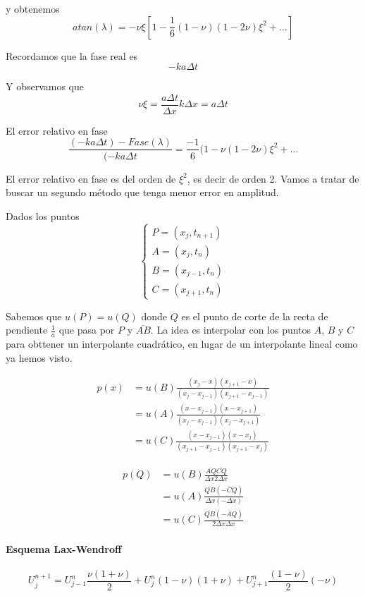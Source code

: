 y obtenemos 
$$atan(\lambda) = -\nu \xi\left[1-\frac{1}{6}(1-\nu)(1-2\nu)\xi^2+\hdots\right]$$

Recordamos que la fase real es
$$-ka\Delta t$$

Y observamos que
$$\nu\xi = \frac{a\Delta t}{\Delta x}k\Delta x = a\Delta t$$

El error relativo en fase
$$\frac{(-ka\Delta t)-Fase(\lambda)}{(-ka\Delta t} = \frac{-1}{6}(1-\nu(1-2\nu)\xi^2+\hdots$$

El error relativo en fase es del orden de $\xi^2$, es decir de orden 2. Vamos a tratar de buscar un segundo método que tenga menor error en amplitud.

Dados los puntos
\begin{equation*}
	\left\{
	\begin{array}{l}
		P = (x_j, t_{n+1})\\
		A = (x_j, t_n)\\
		B = (x_{j-1}, t_n)\\
		C = (x_{j+1}, t_n)
	\end{array}
	\right.
\end{equation*}

Sabemos que $u(P) = u(Q)$ donde $Q$ es el punto de corte de la recta de pendiente $\frac{1}{a}$ que pasa por $P$ y $\overline{AB}$. La idea es interpolar con los puntos $A$, $B$ y $C$ para obttener un interpolante cuadrático, en lugar de un interpolante lineal como ya hemos visto.

\begin{align*}
	p(x) &= u(B)\frac{(x_j-x)(x_{j+1}-x)}{(x_j-x_{j-1})(x_{j+1}-x_{j-1})}\\
	&= u(A)\frac{(x-x_{j-1})(x-x_{j+1})}{(x_j-x_{j-1})(x_{j}-x_{j+1})}\\
	&= u(C)\frac{(x-x_{j-1})(x-x_{j})}{(x_{j+1}-x_{j-1})(x_{j+1}-x_{j})}
\end{align*}

\begin{align*}
	p(Q) &= u(B)\frac{\overline{AQ}\overline{CQ}}{\Delta x2\Delta x}\\
	&= u(A)\frac{\overline{QB}(\overline{-CQ})}{\Delta x(-\Delta x)}\\
	&= u(C)\frac{\overline{QB}(\overline{-AQ})}{2\Delta x\Delta x}
\end{align*}

\paragraph{Esquema Lax-Wendroff}
$$U_j^{n+1}=U_{j-1}^n\frac{\nu(1+\nu)}{2}+U_j^n (1-\nu)(1+\nu)+U_{j+1}^n\frac{(1-\nu)}{2}(-\nu)$$


